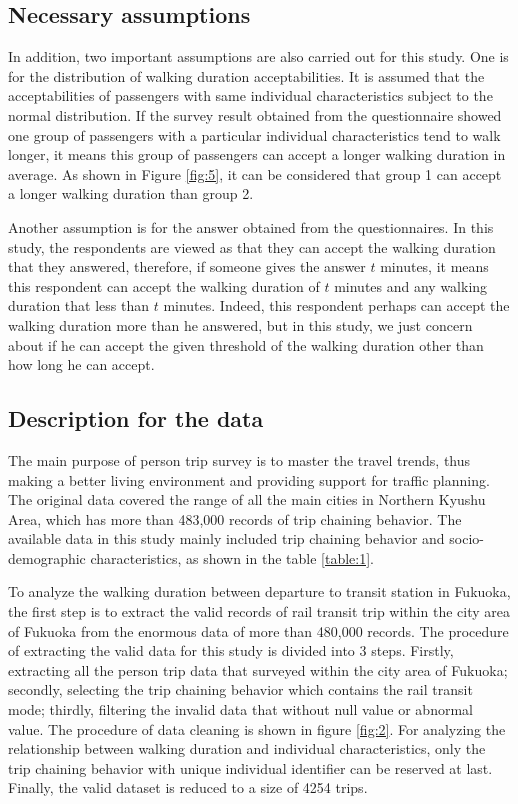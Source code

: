 \documentclass[Journal,letterpaper]{ascelike-new}
\begin{document}
\subsection{Necessary assumptions}
In addition, two important assumptions are also carried out for this study. One is for the distribution of walking duration acceptabilities. It is assumed that the acceptabilities of passengers with same individual characteristics subject to the normal distribution. If the survey result obtained from the questionnaire showed one group of passengers with a particular individual characteristics tend to walk longer, it means this group of passengers can accept a longer walking duration in average. As shown in Figure \ref{fig:5}, it can be considered that group 1 can accept a longer walking duration than group 2.

%
Another assumption is for the answer obtained from the questionnaires. In this study, the respondents are viewed as that they can accept the walking duration that they answered, therefore, if someone gives the answer $t$ minutes, it means this respondent can accept the walking duration of $t$ minutes and any walking duration that less than $t$ minutes. Indeed, this respondent perhaps can accept the walking duration more than he answered, but in this study, we just concern about if he can accept the given threshold of the walking duration other than how long he can accept.

%
\subsection{Description for the data}
The main purpose of person trip survey is to master the travel trends, thus making a better living environment and providing support for traffic planning. The original data covered the range of all the main cities in Northern Kyushu Area, which has more than 483,000 records of trip chaining behavior. The available data in this study mainly included trip chaining behavior and socio-demographic characteristics, as shown in the table \ref{table:1}.

%
To analyze the walking duration between departure to transit station in Fukuoka, the first step is to extract the valid records of rail transit trip within the city area of Fukuoka from the enormous data of more than 480,000 records. The procedure of extracting the valid data for this study is divided into 3 steps. Firstly, extracting all the person trip data that surveyed within the city area of Fukuoka; secondly, selecting the trip chaining behavior which contains the rail transit mode; thirdly, filtering the invalid data that without null value or abnormal value. The procedure of data cleaning is shown in figure \ref{fig:2}. For analyzing the relationship between walking duration and individual characteristics, only the trip chaining behavior with unique individual identifier can be reserved at last. Finally, the valid dataset is reduced to a size of 4254 trips.
\end{document}
